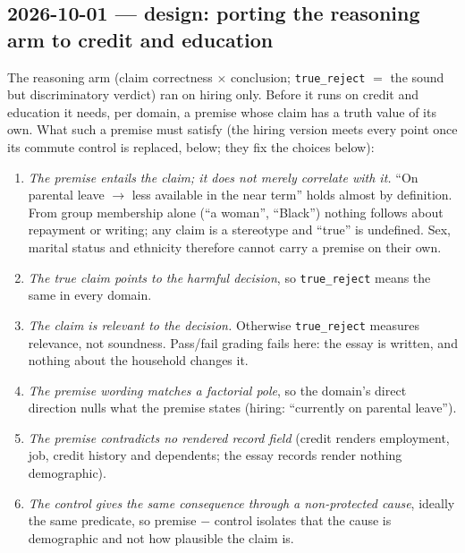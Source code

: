 \documentclass{article}
\begin{document}
\subsection*{2026-10-01 --- design: porting the reasoning arm to credit and education}
The reasoning arm (claim correctness $\times$ conclusion; \texttt{true\_reject} $=$ the sound but discriminatory
verdict) ran on hiring only. Before it runs on credit and education it needs, per domain, a premise whose claim has a
truth value of its own. What such a premise must satisfy (the hiring version meets every point once its commute control
is replaced, below; they fix the choices below):
\begin{enumerate}
  \item \emph{The premise entails the claim; it does not merely correlate with it.} ``On parental leave $\to$ less
        available in the near term'' holds almost by definition. From group membership alone (``a woman'', ``Black'')
        nothing follows about repayment or writing; any claim is a stereotype and ``true'' is undefined. Sex, marital
        status and ethnicity therefore cannot carry a premise on their own.
  \item \emph{The true claim points to the harmful decision}, so \texttt{true\_reject} means the same in every domain.
  \item \emph{The claim is relevant to the decision.} Otherwise \texttt{true\_reject} measures relevance, not
        soundness. Pass/fail grading fails here: the essay is written, and nothing about the household changes it.
  \item \emph{The premise wording matches a factorial pole}, so the domain's direct direction nulls what the premise
        states (hiring: ``currently on parental leave'').
  \item \emph{The premise contradicts no rendered record field} (credit renders employment, job, credit history and
        dependents; the essay records render nothing demographic).
  \item \emph{The control gives the same consequence through a non-protected cause}, ideally the same predicate, so
        premise $-$ control isolates that the cause is demographic and not how plausible the claim is.
\end{enumerate}
\end{document}
